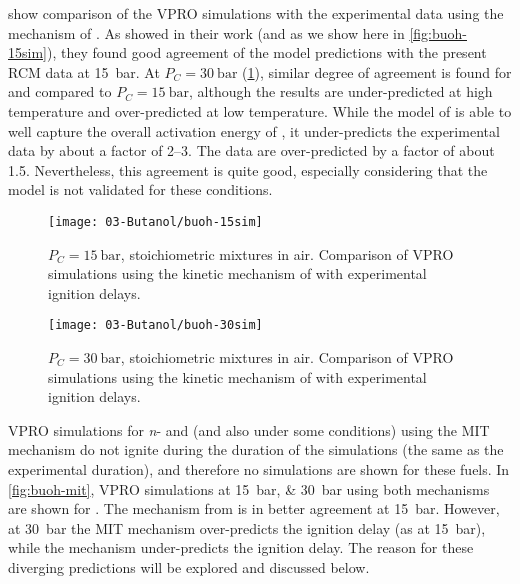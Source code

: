 \documentclass[../main.tex]{subfiles}
\begin{document}
 show comparison of the
VPRO simulations with the experimental data using the mechanism of
\textcite{Sarathy2012}. As \textcite{Sarathy2012} showed in their work (and as
we show here in \cref{fig:buoh-15sim}), they found good agreement of the
model predictions with the present RCM data at \SI{15}{\bar}. At $P_C=\SI{30}{\bar}$
(\cref{fig:buoh-30sim}), similar degree of agreement is found for
\tBuOH{} and \sBuOH{} compared to $P_C=\SI{15}{\bar}$, although
the \sBuOH{} results are under-predicted at high temperature and
over-predicted at low temperature. While the model of \textcite{Sarathy2012} is
able to well capture the overall activation energy of \iBuOH{}, it
under-predicts the experimental data by about a factor of \numrange{2}{3}. The
\nBuOH{} data are over-predicted by a factor of about 1.5.
Nevertheless, this agreement is quite good, especially considering that the
model is not validated for these conditions.

\begin{figure}
    \begin{floatrow}
    \ffigbox
        {\texttt{[image: 03-Butanol/buoh-15sim]}}
        {\caption{$P_C=\SI{15}{\bar}$, stoichiometric mixtures in air. Comparison of
            VPRO simulations using the kinetic mechanism of
            \textcite{Sarathy2012} with experimental ignition delays.}
        \label{fig:buoh-15sim}}
    \ffigbox
        {\texttt{[image: 03-Butanol/buoh-30sim]}}
        {\caption{$P_C=\SI{30}{\bar}$, stoichiometric mixtures in air. Comparison of
            VPRO simulations using the kinetic mechanism of
            \textcite{Sarathy2012} with experimental ignition delays.}
        \label{fig:buoh-30sim}}
    \end{floatrow}
\end{figure}

VPRO simulations for \textit{n}- and \sBuOH{} (and also \tBuOH{} under
some conditions) using the MIT mechanism
\cite{Hansen2013,Merchant2013} do not ignite during the duration of the
simulations (the same as the experimental duration), and therefore no
simulations are shown for these fuels. In \cref{fig:buoh-mit}, VPRO
simulations at \SIlist{15;30}{\bar} using both mechanisms are shown for
\iBuOH{}. The mechanism from \textcite{Sarathy2012}
is in better agreement at \SI{15}{\bar}. However, at \SI{30}{\bar} the MIT mechanism
\cite{Hansen2013,Merchant2013} over-predicts the ignition delay (as at \SI{15}{\bar}),
while the \textcite{Sarathy2012} mechanism under-predicts the ignition delay.
The reason for these diverging predictions will be explored and discussed below.
\end{document}
